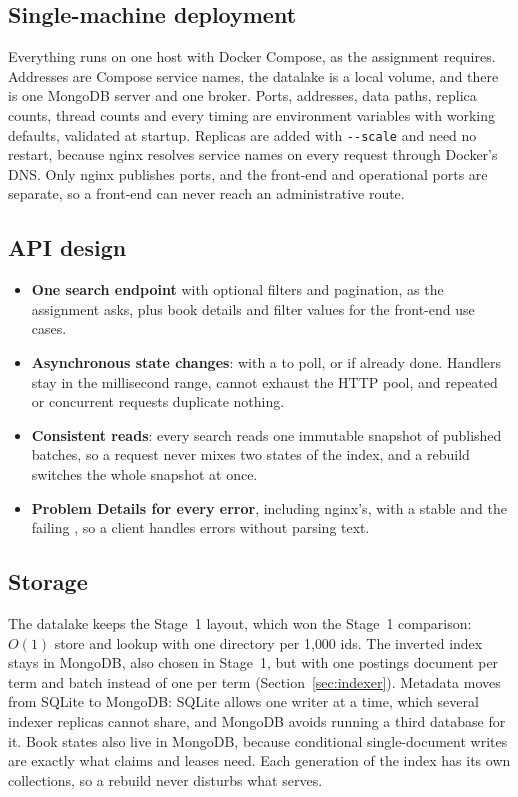 \subsection{Single-machine deployment}

Everything runs on one host with Docker Compose, as the assignment requires. Addresses are Compose service names, the
datalake is a local volume, and there is one MongoDB server and one broker. Ports, addresses, data paths, replica
counts, thread counts and every timing are environment variables with working defaults, validated at startup.
Replicas are added with \texttt{-{}-scale} and need no restart, because nginx resolves service names on every request
through Docker's DNS. Only nginx publishes ports, and the front-end and operational ports are separate, so a front-end
can never reach an administrative route.

\subsection{API design}

\begin{itemize}
\item \textbf{One search endpoint} with optional filters and pagination, as the assignment asks, plus book details and
  filter values for the front-end use cases.
\item \textbf{Asynchronous state changes}:  with a  to poll, or  if already done.
  Handlers stay in the millisecond range, cannot exhaust the HTTP pool, and repeated or concurrent requests duplicate
  nothing.
\item \textbf{Consistent reads}: every search reads one immutable snapshot of published batches, so a request never
  mixes two states of the index, and a rebuild switches the whole snapshot at once.
\item \textbf{Problem Details for every error}, including nginx's, with a stable  and the failing
  , so a client handles errors without parsing text.
\end{itemize}

\subsection{Storage}

The datalake keeps the Stage~1  layout, which won the Stage~1 comparison: $O(1)$ store and lookup with one
directory per 1{,}000 ids. The inverted index stays in MongoDB, also chosen in Stage~1, but with one postings document
per term and batch instead of one per term (Section~\ref{sec:indexer}). Metadata moves from SQLite to MongoDB: SQLite
allows one writer at a time, which several indexer replicas cannot share, and MongoDB avoids running a third database
for it. Book states also live in MongoDB, because conditional single-document writes are exactly what claims and leases
need. Each generation of the index has its own collections, so a rebuild never disturbs what  serves.

